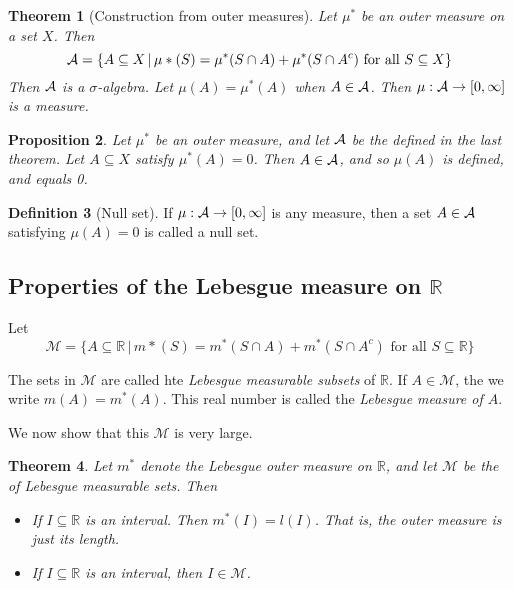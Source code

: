 \documentclass[10pt, oneside, reqno]{amsart}
\theoremstyle{plain}%
\newtheorem{thm}{Theorem}[section]
\newtheorem{prop}[thm]{Proposition}
\theoremstyle{definition}
\newtheorem{defn}[thm]{Definition}
\theoremstyle{remark}
\newcommand{\given}{ \, | \,}
\newcommand{\R}{\mathbb{R}}
\begin{document}
\begin{thm}[Construction from outer measures]
	Let $\mu^*$ be an outer measure on a set $X$.  Then \[
		\siga = \{ A \subseteq X \given \mu*(S) = \mu^*(S \cap A) + \mu^*(S \cap A^c) \text{ for all } S \subseteq X \}
	\]
	Then $\mathcal{A}$ is a $\sigma$-algebra.  Let $\mu(A) = \mu^*(A)$ when $A \in \mathcal{A}$.  Then $\mu : \mathcal{A} \rightarrow [0,\infty]$ is a measure.
\end{thm}

\begin{prop}
	Let $\mu^*$ be an outer measure, and let $\mathcal{A}$ be the \sig defined in the last theorem.  Let $A \subseteq X$ satisfy $\mu^*(A) = 0$.  Then $A \in \mathcal{A}$, and so $\mu(A)$ is defined, and equals 0. 	
\end{prop}

\begin{defn}[Null set]
	If $\mu: \mathcal{A} \rightarrow [0,\infty]$ is any measure, then a set $A \in \mathcal{A}$ satisfying $\mu(A) = 0$ is called a null set.
\end{defn}


\subsection{Properties of the Lebesgue measure on $\R$} %
\label{sub:properties_of_the_lebesgue_measure_on_r_}
Let \[
\mathcal{M} = \{ A \subseteq \R \given m*(S) = m^*(S \cap A) + m^*(S \cap A^c) \text{ for all } S \subseteq \R \}
\]

The sets in $\mathcal{M}$ are called hte \emph{Lebesgue measurable subsets} of $\R$.  If $A \in \mathcal{M}$, the we write $m(A) = m^*(A)$.  This real number is called the \emph{Lebesgue measure of $A$}.  

We now show that this \sig $\mathcal{M}$ is very large.

\begin{thm}Let $m^*$ denote the Lebesgue outer measure on $\R$, and let $\mathcal{M}$ be the \sig of Lebesgue measurable sets.  Then 
	\begin{itemize}
		\item If $I \subseteq \R$ is an interval.  Then $m^*(I) = l(I)$.  That is, the outer measure is just its length.
		\item If $I \subseteq \R$ is an interval, then $I \in \mathcal{M}$.
	\end{itemize}
	
\end{thm}
\end{document}
